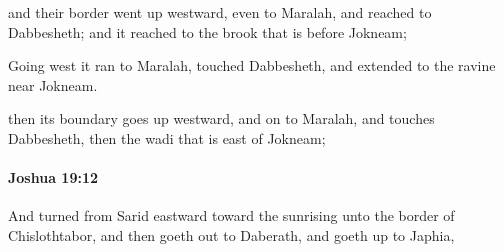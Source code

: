 			\begin{versebox}
					\item[BHS] 
					\item[ASV] and their border went up westward, even to Maralah, and reached to Dabbesheth; and it reached to the brook that is before Jokneam;
					\item[NIV] Going west it ran to Maralah, touched Dabbesheth, and extended to the ravine near Jokneam.
					\item[NRSV] then its boundary goes up westward, and on to Maralah, and touches Dabbesheth, then the wadi that is east of Jokneam;
			\end{versebox}

		\paragraph{Joshua 19:12} %
			\label{JOSHUA-19-12}

			And turned from Sarid eastward toward the sunrising unto the border of Chislothtabor, and then goeth out to Daberath, and goeth up to Japhia,

